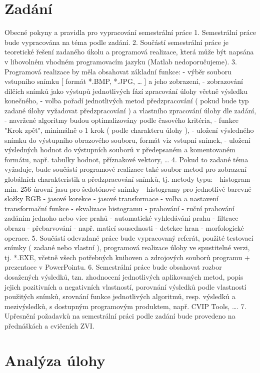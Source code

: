 \documentclass[12pt, a4paper]{report}
\begin{document}
\chapter{Zadání}
Obecné pokyny a pravidla pro vypracování semestrální práce
1. Semestrální práce bude vypracována na téma podle zadání.
2. Součástí semestrální práce je teoretické řešení zadaného úkolu a programová realizace, která
může být napsána v libovolném vhodném programovacím jazyku (Matlab nedoporučujeme).
3. Programová realizace by měla obsahovat základní funkce:
- výběr souboru vstupního snímku [ formát *.BMP, *.JPG, … ] a jeho zobrazení,
- zobrazování dílčích snímků jako výstupů jednotlivých fází zpracování úlohy včetně výsledku
konečného,
- volba pořadí jednotlivých metod předzpracování ( pokud bude typ zadané úlohy vyžadovat
předzpracování ) a vlastního zpracování úlohy dle zadání,
- navržené algoritmy budou optimalizovány podle časového kritéria,
- funkce "Krok zpět", minimálně o 1 krok ( podle charakteru úlohy ),
- uložení výsledného snímku do výstupního obrazového souboru, formát viz vstupní snímek,
- uložení výsledných hodnot do výstupních souborů v předepsaném a komentovaném formátu,
např. tabulky hodnot, příznakové vektory, …
4. Pokud to zadané téma vyžaduje, bude součástí programové realizace také soubor metod pro
zobrazení globálních charakteristik a předzpracování snímků, tj. metody typu:
- histogram - min. 256 úrovní jasu pro šedotónové snímky
- histogramy pro jednotlivé barevné složky RGB
- jasové korekce
- jasové transformace - volba a nastavení transformační funkce
- ekvalizace histogramu
- prahování - ruční prahování zadáním jednoho nebo více prahů
- automatické vyhledávání prahu
- filtrace obrazu
- přebarvování - např. maticí sousednosti
- detekce hran
- morfologické operace.
5. Součástí odevzdané práce bude vypracovaný referát, použité testovací snímky ( zadané nebo
vlastní ), programová realizace úlohy ve spustitelné verzi, tj. *.EXE, včetně všech potřebných
knihoven a zdrojových souborů programu + prezentace v PowerPointu.
6. Semestrální práce bude obsahovat rozbor dosažených výsledků, tzn. zhodnocení jednotlivých
aplikovaných metod, popis jejich pozitivních a negativních vlastností, porovnání výsledků podle
vlastností použitých snímků, srovnání funkce jednotlivých algoritmů, resp. výsledků
a mezivýsledků, s dostupným programovým produktem, např. CVIP Tools, ….
7. Upřesnění požadavků na semestrální práci podle zadání bude provedeno na přednáškách
a cvičeních ZVI.

\chapter{Analýza úlohy}
\end{document}
